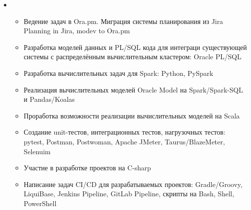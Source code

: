 \documentclass[11pt,a4paper,sans]{moderncv}        %
\begin{document}
{\begin{itemize}
\begin{itemize}
				{Разработана архитектура вычислительного кластера на базе стека технологий BigData: Hadoop HDFS/YARN, ZooKeeper, Spark, Hive, Kyuubi Thrift JDBS/ODBC Server, Alluxio}
				{}
			\item {}
				{Проработка целевой архитектуры распределённой вычислительной системы с использованием различных стеков технологий}
				{}
			\item {}
				{Проработка архитектуры прикладного программного обеспечения и взаимодействия компонент разрабатываемого решения}
				{}
			\item {}
				{Участие в технических совещаниях с заказчиком, участие в защите решения у заказчика, написание технической документации}
				{}
		\end{itemize}
		\item {}
		\begin{itemize}
			\item {}
				{Ведение задач в Ora.pm. Миграция системы планирования из Jira}
				{Planning in Jira, modev to Ora.pm}
			\item {}
				{Разработка моделей данных и PL/SQL кода для интеграци существующей системы с распределённым вычислительным кластером: Oracle PL/SQL}
				{}
			\item {}
				{Разработка вычислительных задач для Spark: Python, PySpark}
				{}
			\item {}
				{Реализация вычислительных моделей Oracle Model на Spark/Spark-SQL и Pandas/Koalas}
				{}
			\item {}
				{Проработка возможности реализации вычислительных моделей на Scala}
				{}
			\item {}
				{Создание unit-тестов, интеграционных тестов, нагрузочных тестов: pytest, Postman, Postwoman, Apache JMeter, Taurus/BlazeMeter, Selenuim}
				{}
			\item {}
				{Участие в разработке проектов на C-sharp}
				{}
			\item {}
				{Написание задач CI/CD для разрабатываемых проектов: Gradle/Groovy, LiquiBase, Jenkins Pipeline, GitLab Pipeline, скрипты на Bash, Shell, PowerShell}
				{}	
		\end{itemize}
	\end{itemize}
}
\end{document}
